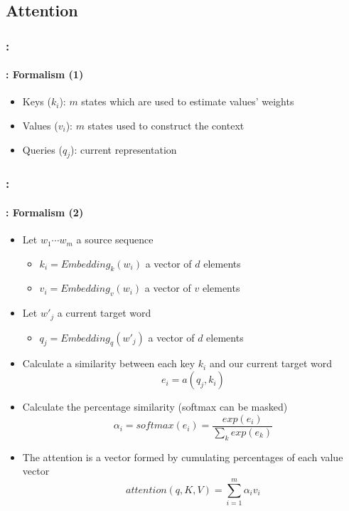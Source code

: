 \documentclass[xcolor=table]{beamer}
\begin{document}
\subsection{Attention}

\begin{frame}
	\frametitle{\insertshortsubtitle: \insertsection}
	\framesubtitle{\insertsubsection: Formalism (1)}
	
	\begin{center}
	\end{center}
	
	\vskip-6pt
	\begin{itemize}
		\item Keys ($k_i$): $m$ states which are used to estimate values' weights
		\item Values ($v_i$): $m$ states used to construct the context 
		\item Queries ($q_j$): current representation 
	\end{itemize}
	
\end{frame}

\begin{frame}
	\frametitle{\insertshortsubtitle: \insertsection}
	\framesubtitle{\insertsubsection: Formalism (2)}
	
	\begin{itemize}
		\item Let $ w_1 \cdots w_m $ a source sequence
		\begin{itemize}
			\item $ k_i =  Embedding_k(w_i)$ a vector of $ d $ elements
			\item $ v_i =  Embedding_v(w_i)$ a vector of $ v $ elements
		\end{itemize}
		\item Let $ w'_j $ a current target word
		\begin{itemize}
			\item $ q_j =  Embedding_q(w'_j)$ a vector of $ d $ elements
		\end{itemize}
		\item Calculate a similarity between each key $ k_i $ and our current target word 
		\[e_i = a(q_j, k_i)\]
		\item Calculate the percentage similarity (softmax can be masked)
		\[\alpha_i = softmax(e_i) = \frac{exp(e_i)}{\sum_k exp(e_k)}\] 
		\item The attention is a vector formed by cumulating percentages of each value vector
		\vspace{-6pt}\[attention(q, K, V) = \sum_{i=1}^{m} \alpha_i v_i\]
	\end{itemize}
\end{frame}
\end{document}
